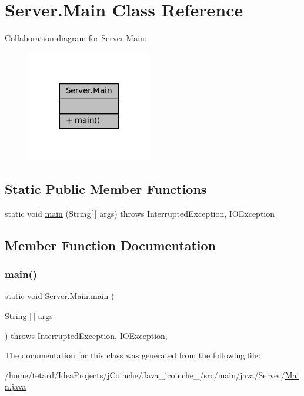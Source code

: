 \hypertarget{classServer_1_1Main}{}\section{Server.\+Main Class Reference}
\label{classServer_1_1Main}


Collaboration diagram for Server.\+Main\+:
\nopagebreak
\begin{figure}[H]
\begin{center}
\leavevmode
\includegraphics[width=155pt]{classServer_1_1Main__coll__graph}
\end{center}
\end{figure}
\subsection*{Static Public Member Functions}
\begin{DoxyCompactItemize}
\item 
static void \mbox{\hyperlink{classServer_1_1Main_a76af90a600f09ced690adf36a6a1dfce}{main}} (String\mbox{[}$\,$\mbox{]} args)  throws Interrupted\+Exception, I\+O\+Exception 
\end{DoxyCompactItemize}


\subsection{Member Function Documentation}
\mbox{\label{classServer_1_1Main_a76af90a600f09ced690adf36a6a1dfce}} 
\subsubsection{\texorpdfstring{main()}{main()}}
{\footnotesize\ttfamily static void Server.\+Main.\+main (\begin{DoxyParamCaption}\item[{String \mbox{[}$\,$\mbox{]}}]{args }\end{DoxyParamCaption}) throws Interrupted\+Exception, I\+O\+Exception\hspace{0.3cm}{\ttfamily [inline]}, {\ttfamily [static]}}



The documentation for this class was generated from the following file\+:\begin{DoxyCompactItemize}
\item 
/home/tetard/\+Idea\+Projects/j\+Coinche/\+Java\+\_\+jcoinche\+\_/src/main/java/\+Server/\mbox{\hyperlink{Server_2Main_8java}{Main.\+java}}\end{DoxyCompactItemize}
